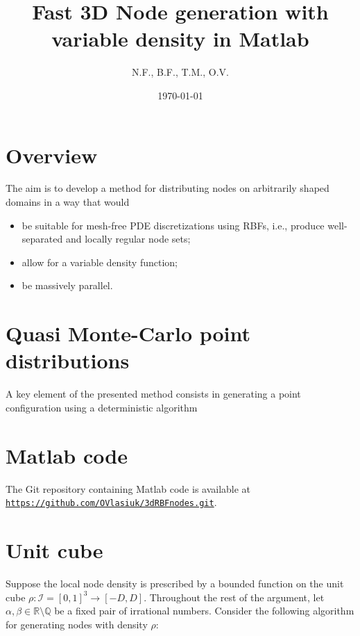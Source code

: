 \documentclass[10pt]{amsart}
\title{Fast 3D Node generation with variable density in Matlab}
\author{N.F., B.F., T.M., O.V.}
\date{\today}
\begin{document}
\maketitle

\section{Overview}

The aim is to develop a method for distributing nodes on arbitrarily shaped domains in a way that would 
\begin{itemize}
 \item be suitable for mesh-free PDE discretizations using RBFs, i.e., produce well-separated and locally regular node sets;
 \item allow for a variable density function;
 \item be massively parallel.
\end{itemize}

\section{Quasi Monte-Carlo point distributions}

A key element of the presented method consists in generating a point configuration using a deterministic algorithm 

\section{Matlab code}

The Git repository containing Matlab code is available at  \texttt{\url{https://github.com/OVlasiuk/3dRBFnodes.git}}.

\section{Unit cube}

Suppose the local node density is prescribed by a bounded function on the unit cube  $\rho: \mathcal{I} =[0,1]^3 \to [-D,D]$. Throughout the rest of the argument, let $ \alpha, \beta\in\mathbb{R}\setminus\mathbb{Q} $ be a fixed pair of irrational numbers. Consider the following algorithm for generating nodes with density $ \rho $:  
\end{document}
